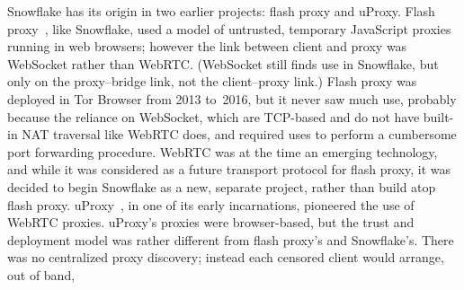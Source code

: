 \documentclass[letterpaper,twocolumn]{article}
\begin{document}
Snowflake has its origin in two earlier projects:
flash proxy and uProxy.
Flash proxy~\cite{Fifield2012a}, like Snowflake, used a model
of untrusted, temporary JavaScript proxies running in web browsers;
however the link between client and proxy was WebSocket
rather than WebRTC.
(WebSocket still finds use in Snowflake,
but only on the proxy--bridge link,
not the client--proxy link.)
Flash proxy was deployed in Tor Browser
from 2013 to~2016,
but it never saw much use,
probably because the reliance on WebSocket,
which are TCP-based and do not have built-in NAT traversal like WebRTC does,
and required uses to perform a
cumbersome port forwarding procedure.
WebRTC was at the time an emerging technology, and while
it was considered as a future transport protocol for flash proxy,
it was decided to begin Snowflake as a new, separate project,
rather than build atop flash proxy.
uProxy~\cite{uproxy}, in one of its early incarnations,
pioneered the use of WebRTC proxies.
uProxy's proxies were browser-based,
but the trust and deployment model was rather different
from flash proxy's and Snowflake's.
There was no centralized proxy discovery;
instead each censored client would arrange, out of band,
\end{document}
